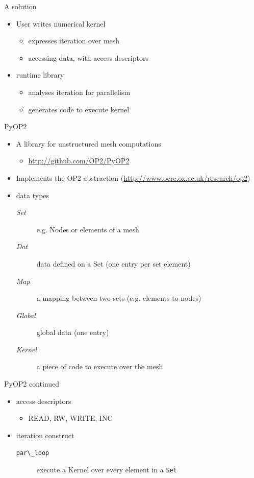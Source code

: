 \documentclass[bigger]{beamer}
\begin{document}
\begin{frame}[label={sec:orgheadline10}]{A solution}
\begin{itemize}
\item User writes numerical kernel
\begin{itemize}
\item expresses iteration over mesh
\item accessing data, with access descriptors
\end{itemize}
\item runtime library
\begin{itemize}
\item analyses iteration for parallelism
\item generates code to execute kernel
\end{itemize}
\end{itemize}
\end{frame}

\begin{frame}[label={sec:orgheadline11}]{PyOP2}
\begin{itemize}
\item A library for unstructured mesh computations
\begin{itemize}
\item \url{http://github.com/OP2/PyOP2}
\end{itemize}
\item Implements the OP2 abstraction (\url{http://www.oerc.ox.ac.uk/research/op2})
\item data types
\begin{description}
\item[{\emph{Set}}] e.g. Nodes or elements of a mesh
\item[{\emph{Dat}}] data defined on a Set (one entry per set element)
\item[{\emph{Map}}] a mapping between two sets (e.g. elements to nodes)
\item[{\emph{Global}}] global data (one entry)
\item[{\emph{Kernel}}] a piece of code to execute over the mesh
\end{description}
\end{itemize}
\end{frame}

\begin{frame}[fragile,label={sec:orgheadline12}]{PyOP2 continued}
 \begin{itemize}
\item access descriptors
\begin{itemize}
\item READ, RW, WRITE, INC
\end{itemize}
\item iteration construct
\begin{description}
\item[\verb~par\_loop~] execute a Kernel over every element in a \texttt{Set}
\end{description}
\end{itemize}
\end{frame}
\end{document}
